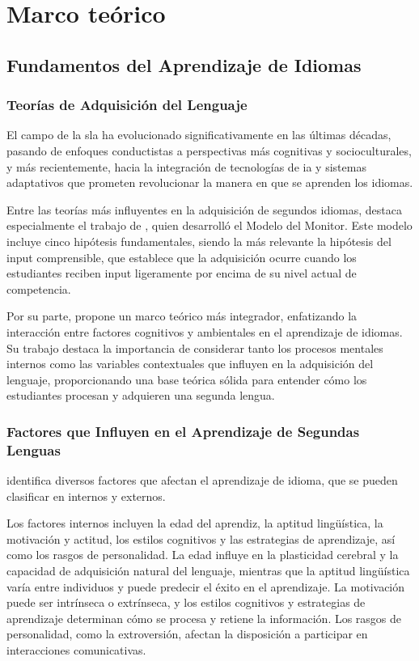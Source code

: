 \chapter{Marco teórico}
\label{marco-teorico}

\section{Fundamentos del Aprendizaje de Idiomas}

\subsection{Teorías de Adquisición del Lenguaje}

El campo de la \gls{sla} ha evolucionado significativamente en las últimas décadas, pasando de enfoques conductistas a perspectivas más cognitivas y socioculturales, y más recientemente, hacia la integración de tecnologías de \gls{ia} y sistemas adaptativos que prometen revolucionar la manera en que se aprenden los idiomas.

Entre las teorías más influyentes en la adquisición de segundos idiomas, destaca especialmente el trabajo de \cite{krashen1982principles}, quien desarrolló el Modelo del Monitor. Este modelo incluye cinco hipótesis fundamentales, siendo la más relevante la hipótesis del input comprensible, que establece que la adquisición ocurre cuando los estudiantes reciben input ligeramente por encima de su nivel actual de competencia.

Por su parte, \cite{ellis1994study} propone un marco teórico más integrador, enfatizando la interacción entre factores cognitivos y ambientales en el aprendizaje de idiomas. Su trabajo destaca la importancia de considerar tanto los procesos mentales internos como las variables contextuales que influyen en la adquisición del lenguaje, proporcionando una base teórica sólida para entender cómo los estudiantes procesan y adquieren una segunda lengua.

\subsection{Factores que Influyen en el Aprendizaje de Segundas Lenguas}

\cite{ellis1994study} identifica diversos factores que afectan el aprendizaje de idioma, que se pueden clasificar en internos y externos.

Los factores internos incluyen la edad del aprendiz, la aptitud lingüística, la motivación y actitud, los estilos cognitivos y las estrategias de aprendizaje, así como los rasgos de personalidad. La edad influye en la plasticidad cerebral y la capacidad de adquisición natural del lenguaje, mientras que la aptitud lingüística varía entre individuos y puede predecir el éxito en el aprendizaje. La motivación puede ser intrínseca o extrínseca, y los estilos cognitivos y estrategias de aprendizaje determinan cómo se procesa y retiene la información. Los rasgos de personalidad, como la extroversión, afectan la disposición a participar en interacciones comunicativas.

